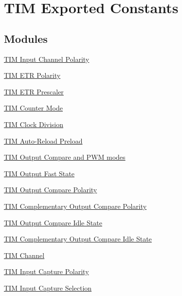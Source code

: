 \hypertarget{group___t_i_m___exported___constants}{}\section{T\+IM Exported Constants}
\label{group___t_i_m___exported___constants}
\subsection*{Modules}
\begin{DoxyCompactItemize}
\item 
\hyperlink{group___t_i_m___input___channel___polarity}{T\+I\+M Input Channel Polarity}
\item 
\hyperlink{group___t_i_m___e_t_r___polarity}{T\+I\+M E\+T\+R Polarity}
\item 
\hyperlink{group___t_i_m___e_t_r___prescaler}{T\+I\+M E\+T\+R Prescaler}
\item 
\hyperlink{group___t_i_m___counter___mode}{T\+I\+M Counter Mode}
\item 
\hyperlink{group___t_i_m___clock_division}{T\+I\+M Clock Division}
\item 
\hyperlink{group___t_i_m___auto_reload_preload}{T\+I\+M Auto-\/\+Reload Preload}
\item 
\hyperlink{group___t_i_m___output___compare__and___p_w_m__modes}{T\+I\+M Output Compare and P\+W\+M modes}
\item 
\hyperlink{group___t_i_m___output___fast___state}{T\+I\+M Output Fast State}
\item 
\hyperlink{group___t_i_m___output___compare___polarity}{T\+I\+M Output Compare Polarity}
\item 
\hyperlink{group___t_i_m___output___compare___n___polarity}{T\+I\+M Complementary Output Compare Polarity}
\item 
\hyperlink{group___t_i_m___output___compare___idle___state}{T\+I\+M Output Compare Idle State}
\item 
\hyperlink{group___t_i_m___output___compare___n___idle___state}{T\+I\+M Complementary Output Compare Idle State}
\item 
\hyperlink{group___t_i_m___channel}{T\+I\+M Channel}
\item 
\hyperlink{group___t_i_m___input___capture___polarity}{T\+I\+M Input Capture Polarity}
\item 
\hyperlink{group___t_i_m___input___capture___selection}{T\+I\+M Input Capture Selection}
\item 

\end{DoxyCompactItemize}

